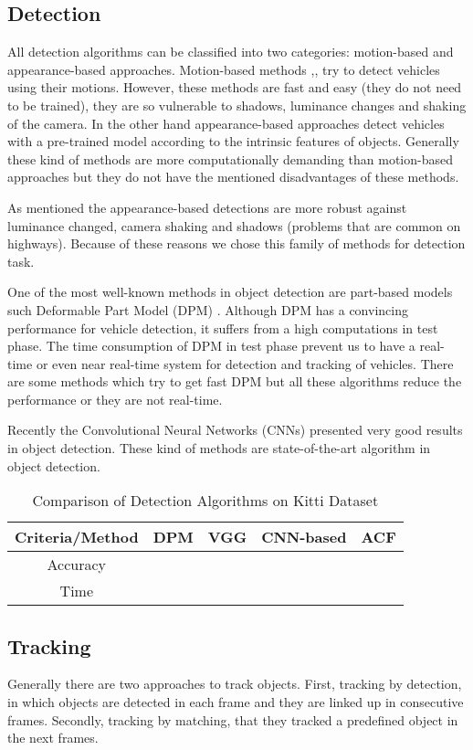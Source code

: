 \documentclass[conference]{IEEEtran}
\begin{document}
\subsection{Detection}
All detection algorithms can be classified into two categories: motion-based and appearance-based approaches. Motion-based methods \cite{sen2004robust},\cite{sirikuntamat2015vehicle},\cite{lu2014moving} try to detect vehicles using their motions. However, these methods are fast and easy (they do not need to be trained), they are so vulnerable to shadows, luminance changes and shaking of the camera. In the other hand appearance-based approaches detect vehicles with a pre-trained model according to the intrinsic features of objects. Generally these kind of methods are more  computationally demanding than motion-based approaches but they do not have the mentioned disadvantages of these methods.

As mentioned the appearance-based detections are more robust against luminance changed, camera shaking and shadows (problems that are common on highways). Because of these reasons we chose this family of methods for detection task. 

One of the most well-known methods in object detection are part-based models such Deformable Part Model (DPM) \cite{felzenszwalb2008discriminatively}. Although DPM has a convincing performance for vehicle detection, it suffers from a high computations in test phase. The time consumption of DPM in test phase prevent us to have a real-time or even near real-time system for detection and tracking of vehicles. There are some methods which try to get fast DPM \cite{} but all these algorithms reduce the performance or they are not real-time.

Recently the Convolutional Neural Networks (CNNs) presented very good results in object detection. These kind of methods are state-of-the-art algorithm in object detection.

\begin{table}[here]
	\label{detections}
	\caption{Comparison of Detection Algorithms on Kitti Dataset}
	\centering
\begin{tabular}{c c c c c}	
	

	Criteria/Method & DPM & VGG & CNN-based & ACF \\
	\hline
	 Accuracy& & & & \\
	   Time & & & &

\end{tabular}	
\end{table}
\subsection{Tracking}
Generally there are two approaches to track objects. First, tracking by detection, in which objects are detected in each frame and they are linked up in consecutive frames. Secondly, tracking by matching, that they tracked a predefined object in the next frames.
\end{document}

